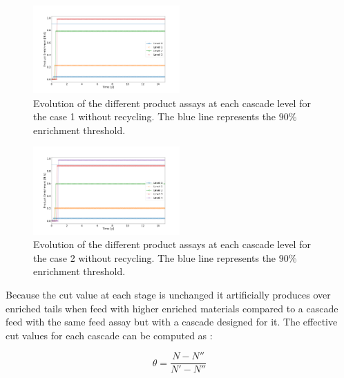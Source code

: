 \documentclass{anstrans}
\begin{document}
\begin{figure}[ht] %
  \centering
  \includegraphics[width=0.5\textwidth]{assay_case_1_no_rec.png}
  \caption{Evolution of the different product assays at each cascade level for
  the case 1 without recycling. The blue line represents the $90\%$ enrichment
  threshold.}\label{fig:assay_c1_nr}
\end{figure}
\begin{figure}[ht] %
  \centering
  \includegraphics[width=0.5\textwidth]{assay_case_2_no_rec.png}
  \caption{Evolution of the different product assays at each cascade level for
  the case 2 without recycling. The blue line represents the $90\%$ enrichment
  threshold.}\label{fig:assay_c2_nr}
\end{figure}

Because the cut value at each stage is unchanged it artificially produces over
enriched tails when feed with higher enriched materials compared to a cascade
feed with the same feed assay but with a cascade designed for it.  The effective
cut values for each cascade can be computed as :

\begin{equation}\label{eq:theta_eff}
    \theta = \dfrac{N - N''}{N'-N''}
\end{equation}
\end{document}
